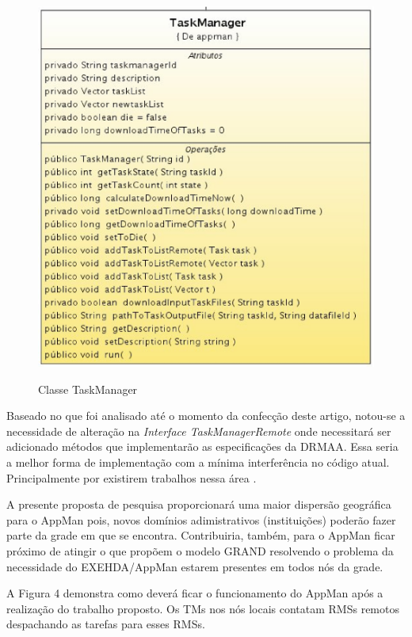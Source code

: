 \begin{figure}[h]
\center
\includegraphics[scale=.4]{img/TaskManager.eps}
\label{TaskManager}
\caption{Classe TaskManager}
\end{figure}

Baseado no que foi analisado até o momento da confecção deste artigo, notou-se a necessidade de alteração na {\it Interface TaskManagerRemote} onde necessitará ser adicionado métodos que implementarão as especificações da DRMAA. Essa seria a melhor forma de implementação com a mínima interferência no código atual. Principalmente por existirem trabalhos nessa área \cite{Nobres2007}.

A presente proposta de pesquisa proporcionará uma maior dispersão geográfica para o AppMan pois, novos domínios adimistrativos (instituições) poderão fazer parte da grade em que se encontra. Contribuiria, também, para o AppMan ficar próximo de atingir o que propõem o modelo GRAND resolvendo o problema da necessidade do EXEHDA/AppMan estarem presentes em todos nós da grade. 

A Figura 4 demonstra como deverá ficar o funcionamento do AppMan após a realização do trabalho proposto. Os TMs nos nós locais contatam RMSs remotos despachando as tarefas para esses RMSs.

